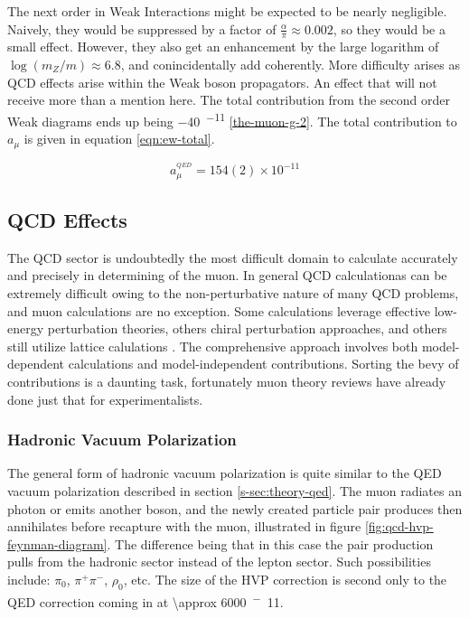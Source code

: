 The next order in Weak Interactions might be expected to be nearly negligible.  Naively, they would be suppressed by a factor of $\frac{\alpha}{\pi} \approx 0.002$, so they would be a small effect.  However, they also get an enhancement by the large logarithm of $\log(m_Z/m) \approx 6.8$, and conincidentally add coherently.  More difficulty arises as QCD effects arise within the Weak boson propagators.  An effect that will not receive more than a mention here.  The total contribution from the second order Weak diagrams ends up being \SI{-40}{^{-11}} \ref{the-muon-g-2}.  The total contribution to $a_\mu$ is given in equation \ref{eqn:ew-total}. 

\begin{equation}
\label{eqn:ew-total}
a_\mu^{^{QED}} = 154(2) \times 10^{-11}
\end{equation}


\subsection{QCD Effects} \label{s-sec:theory-qcd}

The QCD sector is undoubtedly the most difficult domain to calculate accurately and precisely in determining \gmtwo of the muon.  In general QCD calculationas can be extremely difficult owing to the non-perturbative nature of many QCD problems, and muon \gmtwo calculations are no exception.  Some calculations leverage effective low-energy perturbation theories, others chiral perturbation approaches, and others still utilize lattice calulations .  The comprehensive approach involves both model-dependent calculations and model-independent contributions.  Sorting the bevy of contributions is a daunting task, fortunately muon \gmtwo theory reviews have already done just that for experimentalists.

\subsubsection{Hadronic Vacuum Polarization}

The general form of hadronic vacuum polarization is quite similar to the QED vacuum polarization described in section \ref{s-sec:theory-qed}.  The muon radiates an photon or emits another boson, and the newly created particle pair produces then annihilates before recapture with the muon, illustrated in figure \ref{fig:qcd-hvp-feynman-diagram}.  The difference being that in this case the pair production pulls from the hadronic sector instead of the lepton sector.  Such possibilities include: $\pi_0$, $\pi^+\pi^-$, $\rho_0$, etc.  The size of the HVP correction is second only to the QED correction coming in at \SI{\approx 6000}{^-11}.  

